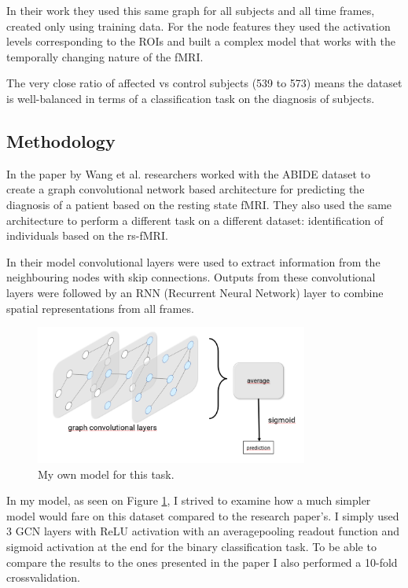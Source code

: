 	In their work they used this same graph for all subjects and all time frames, created only using training data. For the node features they used the activation levels corresponding to the ROIs and built a complex model that works with the temporally changing nature of the fMRI. 
	
	
	The very close ratio of affected vs control subjects (539 to 573) means the dataset is well-balanced in terms of a classification task on the diagnosis of subjects. 
	
	\subsection{Methodology}
	In the paper \cite{wang2021graph} by Wang et al. researchers worked with the ABIDE dataset to create a graph convolutional network based architecture for predicting the diagnosis of a patient based on the resting state fMRI. They also used the same architecture to perform a different task on a different dataset: identification of individuals based on the rs-fMRI.
	
	
	 In their model convolutional layers were used to extract information from the neighbouring nodes with skip connections. Outputs from these convolutional layers were followed by an RNN (Recurrent Neural Network) layer to combine spatial representations from all frames. 
	
	\begin{figure}[!h]
		\centering
		\includegraphics[width=0.8\textwidth]{figures/onlab_abra.png}
		\caption{My own model for this task.}
		\label{fig:onlab}
	\end{figure}
	
	In my model, as seen on Figure \ref{fig:onlab}, I strived to examine how a much simpler model would fare on this dataset compared to the research paper's. I simply used 3 GCN layers with ReLU activation with an averagepooling readout function and sigmoid activation at the end for the binary classification task. To be able to compare the results to the ones presented in the paper I also performed a 10-fold crossvalidation.
	
